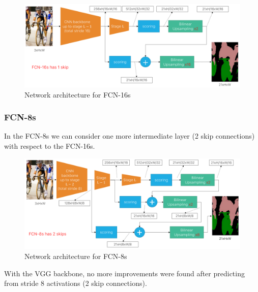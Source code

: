 \begin{figure}[htbp]
  \centering
  \includegraphics[width=0.7\linewidth]{./img/fcn16.png}
  \caption{Network architecture for FCN-16s}
\end{figure}

\subsubsection{FCN-8s}
In the FCN-8s we can consider one more intermediate layer (2 skip connections) with respect to the FCN-16s.

\begin{figure}[htbp]
  \centering
  \includegraphics[width=0.7\linewidth]{./img/fcn8.png}
  \caption{Network architecture for FCN-8s}
\end{figure}

With the VGG backbone, no more improvements were found after predicting from stride 8 activations (2 skip connections).




